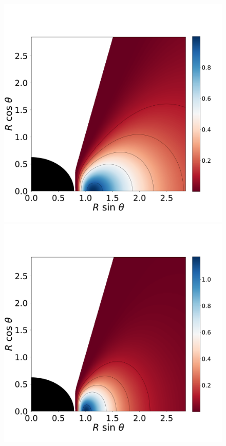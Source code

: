 \documentclass[twocolumn,aps,showpacs,showkeys,prd,superscriptaddress,byrevtex, amsmath]{revtex4-1}
\begin{document}
\begin{figure}
\centering
\includegraphics[scale=0.14]{figures/fig3_I_10.pdf}
\hspace{-0.3cm}
\includegraphics[scale=0.14]{figures/fig3_I_1.pdf}

\end{figure}
\end{document}
